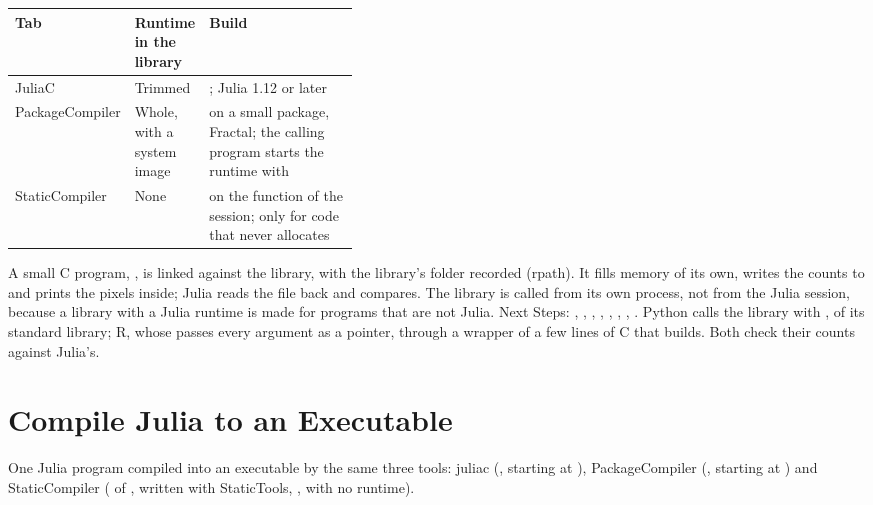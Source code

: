 \begin{center}\small
\renewcommand{\arraystretch}{1.25}
\begin{tabularx}{\linewidth}{@{}p{0.2\linewidth}p{0.2\linewidth}L@{}}
\toprule
\textbf{Tab} & \textbf{Runtime in the library} & \textbf{Build}\\
\midrule
JuliaC & Trimmed & ; Julia 1.12 or later\\
PackageCompiler & Whole, with a system image &  on a small package, Fractal; the calling program
  starts the runtime with \\
StaticCompiler & None &  on the function of the session; only for code that never allocates\\
\bottomrule
\end{tabularx}
\end{center}
A small C program, , is linked against the library, with the library's folder recorded (rpath). It
fills memory of its own, writes the counts to  and prints the pixels inside; Julia reads the file back
and compares. The library is called from its own process, not from the Julia session, because a library with a Julia
runtime is made for programs that are not Julia. Next Steps: , ,
, , , ,
, . Python calls the library with , of its
standard library; R, whose  passes every argument as a pointer, through a wrapper of a few lines of C that
 builds. Both check their counts against Julia's.

\section{Compile Julia to an Executable}\label{sec:exe}
One Julia program compiled into an executable by the same three tools: juliac (, starting at ), PackageCompiler (, starting at ) and
StaticCompiler ( of , written with StaticTools, , with no runtime).

